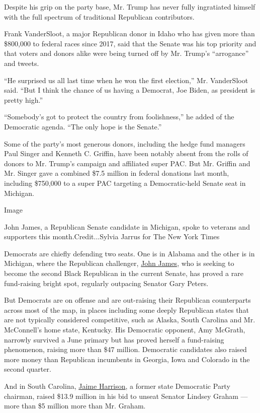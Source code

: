 Despite his grip on the party base, Mr. Trump has never fully
ingratiated himself with the full spectrum of traditional Republican
contributors.

Frank VanderSloot, a major Republican donor in Idaho who has given more
than \$800,000 to federal races since 2017, said that the Senate was his
top priority and that voters and donors alike were being turned off by
Mr. Trump's ``arrogance'' and tweets.

``He surprised us all last time when he won the first election,'' Mr.
VanderSloot said. ``But I think the chance of us having a Democrat, Joe
Biden, as president is pretty high.''

``Somebody's got to protect the country from foolishness,'' he added of
the Democratic agenda. ``The only hope is the Senate.''

Some of the party's most generous donors, including the hedge fund
managers Paul Singer and Kenneth C. Griffin, have been notably absent
from the rolls of donors to Mr. Trump's campaign and affiliated super
PAC. But Mr. Griffin and Mr. Singer gave a combined \$7.5 million in
federal donations last month, including \$750,000 to a super PAC
targeting a Democratic-held Senate seat in Michigan.

Image

John James, a Republican Senate candidate in Michigan, spoke to veterans
and supporters this month.Credit...Sylvia Jarrus for The New York Times

Democrats are chiefly defending two seats. One is in Alabama and the
other is in Michigan, where the Republican challenger,
\href{https://www.nytimes3xbfgragh.onion/2020/07/08/us/politics/john-james-michigan-senate.html}{John
James}, who is seeking to become the second Black Republican in the
current Senate, has proved a rare fund-raising bright spot, regularly
outpacing Senator Gary Peters.

But Democrats are on offense and are out-raising their Republican
counterparts across most of the map, in places including some deeply
Republican states that are not typically considered competitive, such as
Alaska, South Carolina and Mr. McConnell's home state, Kentucky. His
Democratic opponent, Amy McGrath, narrowly survived a June primary but
has proved herself a fund-raising phenomenon, raising more than \$47
million. Democratic candidates also raised more money than Republican
incumbents in Georgia, Iowa and Colorado in the second quarter.

And in South Carolina,
\href{https://www.nytimes3xbfgragh.onion/2019/05/29/us/politics/jaime-harrison-lindsey-graham.html}{Jaime
Harrison}, a former state Democratic Party chairman, raised \$13.9
million in his bid to unseat Senator Lindsey Graham --- more than \$5
million more than Mr. Graham.

